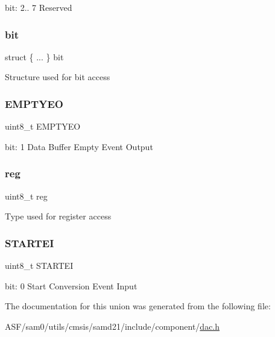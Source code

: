 bit\+: 2.. 7 Reserved \mbox{\label{union_d_a_c___e_v_c_t_r_l___type_ac15fe2161f8f0d2bcf6655874561bce9}} 
\subsubsection{\texorpdfstring{bit}{bit}}
{\footnotesize\ttfamily struct \{ ... \}   bit}

Structure used for bit access \mbox{\label{union_d_a_c___e_v_c_t_r_l___type_a0d6a3a8ae3093ec1e9b030c9f3b6148c}} 
\subsubsection{\texorpdfstring{EMPTYEO}{EMPTYEO}}
{\footnotesize\ttfamily uint8\+\_\+t E\+M\+P\+T\+Y\+EO}

bit\+: 1 Data Buffer Empty Event Output \mbox{\label{union_d_a_c___e_v_c_t_r_l___type_a9428adc9af4653a2050e2536b55dec8d}} 
\subsubsection{\texorpdfstring{reg}{reg}}
{\footnotesize\ttfamily uint8\+\_\+t reg}

Type used for register access \mbox{\label{union_d_a_c___e_v_c_t_r_l___type_aa41cf9b362f9377e62cd91c88353fddc}} 
\subsubsection{\texorpdfstring{STARTEI}{STARTEI}}
{\footnotesize\ttfamily uint8\+\_\+t S\+T\+A\+R\+T\+EI}

bit\+: 0 Start Conversion Event Input 

The documentation for this union was generated from the following file\+:\begin{DoxyCompactItemize}
\item 
A\+S\+F/sam0/utils/cmsis/samd21/include/component/\mbox{\hyperlink{component_2dac_8h}{dac.\+h}}\end{DoxyCompactItemize}
